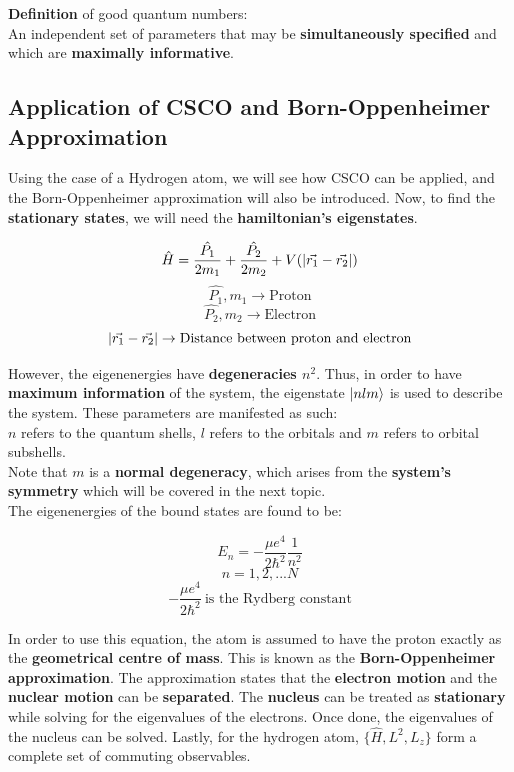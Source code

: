 \documentclass{article}
\begin{document}
\begin{flushleft}
\textbf{Definition} of good quantum numbers:\\
An independent set of parameters that may be \textbf{simultaneously specified} and which are \textbf{maximally informative}.

\subsection{Application of CSCO and Born-Oppenheimer Approximation}

Using the case of a Hydrogen atom, we will see how CSCO can be applied, and the Born-Oppenheimer approximation will also be introduced. Now, to find the \textbf{stationary states}, we will need the \textbf{hamiltonian's eigenstates}.

$$\hat{H}=\frac{\hat{P_1}}{2m_1}+\frac{\hat{P_2}}{2m_2}+V(\abs{\vec{r_1}-\vec{r_2}})$$
$$\hat{P_1},m_1\rightarrow \text{Proton}$$
$$\hat{P_2},m_2\rightarrow \text{Electron}$$
$$\abs{\vec{r_1}-\vec{r_2}}\rightarrow \text{Distance between proton and electron}$$

\pagebreak
However, the eigenenergies have \textbf{degeneracies $n^2$}. Thus, in order to have \textbf{maximum information} of the system, the eigenstate $\ket{nlm}$ is used to describe the system. These parameters are manifested as such:\\
$n$ refers to the quantum shells, $l$ refers to the orbitals and $m$ refers to orbital subshells.\\ 

Note that $m$ is a \textbf{normal degeneracy}, which arises from the \textbf{system's symmetry} which will be covered in the next topic.\\[0.5cm]

The eigenenergies of the bound states are found to be:

$$E_n=-\frac{\mu e^4}{2\hbar^2}\frac{1}{n^2}$$
$$n=1,2,...N$$
$$-\frac{\mu e^4}{2\hbar^2}\ \text{is the Rydberg constant}$$

In order to use this equation, the atom is assumed to have the proton exactly as the \textbf{geometrical centre of mass}. This is known as the \textbf{Born-Oppenheimer approximation}. The approximation states that the \textbf{electron motion} and the \textbf{nuclear motion} can be \textbf{separated}. The \textbf{nucleus} can be treated as \textbf{stationary} while solving for the eigenvalues of the electrons. Once done, the eigenvalues of the nucleus can be solved. Lastly, for the hydrogen atom, $\{\hat{H},L^2,L_z\}$ form a complete set of commuting observables.\\[0.5cm]


\end{flushleft}
\end{document}
